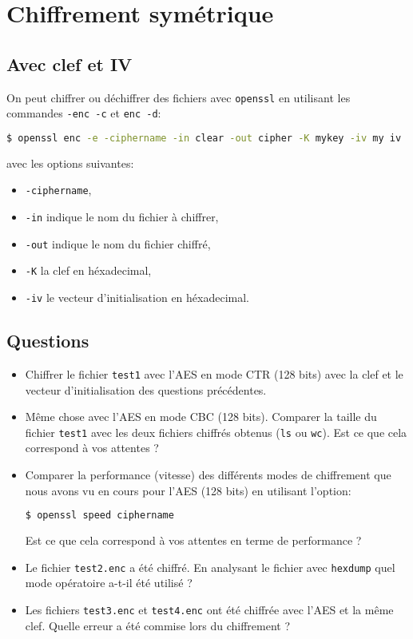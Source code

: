 \documentclass{article}
\begin{document}
\section{Chiffrement symétrique}

\subsection{Avec clef et IV}

On peut chiffrer ou déchiffrer des fichiers avec \texttt{openssl} en utilisant les commandes \texttt{-enc -c} et
\texttt{enc -d}:
\begin{lstlisting}[language=bash]
$ openssl enc -e -ciphername -in clear -out cipher -K mykey -iv my iv
\end{lstlisting}
avec les options suivantes:
\begin{itemize}

\item \texttt{-ciphername},
\item \texttt{-in} indique le nom du fichier à chiffrer,
\item \texttt{-out} indique le nom du fichier chiffré,
\item \texttt{-K} la clef en héxadecimal,
\item \texttt{-iv} le vecteur d’initialisation en héxadecimal.
\end{itemize}


\subsection*{Questions}
\begin{itemize}

\item Chiffrer le fichier \texttt{test1} avec l’AES en mode CTR (128 bits) avec la clef et le vecteur
d’initialisation des questions précédentes.
\item Même chose avec l’AES en mode CBC (128 bits). Comparer la taille du fichier \texttt{test1} avec
les deux fichiers chiffrés obtenus (\texttt{ls} ou \texttt{wc}). Est ce que cela correspond à vos attentes ?
\item Comparer la performance (vitesse) des différents modes de chiffrement que nous avons vu en
cours pour l’AES (128 bits) en utilisant l’option:
\begin{lstlisting}[language=bash]
$ openssl speed ciphername
\end{lstlisting}

Est ce que cela correspond à vos attentes en terme de performance ?


\item Le fichier \texttt{test2.enc} a été chiffré. En analysant le fichier avec \texttt{hexdump} quel mode opératoire
a-t-il été utilisé ?
\item Les fichiers \texttt{test3.enc} et \texttt{test4.enc} ont été chiffrée avec l’AES et la même clef. Quelle erreur
a été commise lors du chiffrement ?
\end{itemize}
\end{document}
